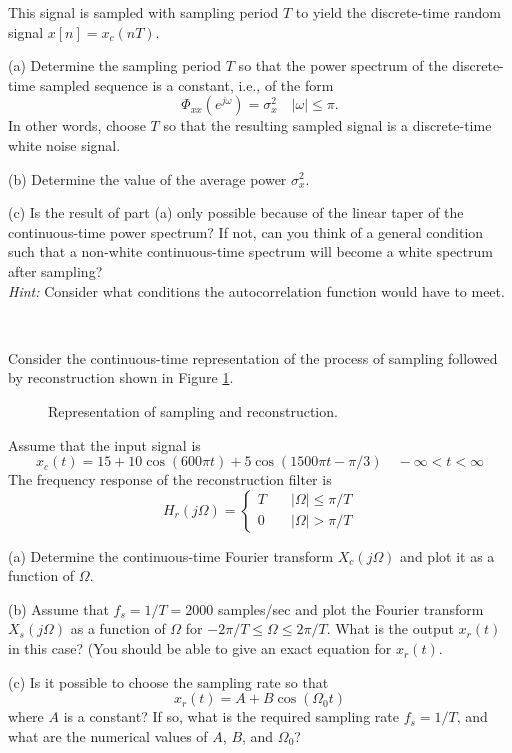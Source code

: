 \documentclass[12pt]{report}
\begin{document}
This signal is sampled with sampling period $T$ to yield the discrete-time
random signal $x[n]=x_c(nT)$.
\begin{description}
\item{(a)} Determine the sampling period $T$ so that the power spectrum of
    the discrete-time sampled sequence is a constant, i.e., of the form\[
    \Phi_{xx}(e^{j\omega}) = \sigma_x^2\quad |\omega|\leq \pi.
    \]
    In other words, choose $T$ so that the resulting sampled signal is a
discrete-time white noise signal.

\item{(b)} Determine the value of the average power $\sigma_x^2$.
\item{(c)}  Is the result of part (a) only possible because of the linear
    taper of the continuous-time power spectrum?  If not, can you think of
    a general condition such that a non-white continuous-time spectrum will
    become a white spectrum after sampling? \\
\emph{Hint:} Consider what conditions the autocorrelation function would have to meet.%
\end{description}
\mbox{}\\

\mbox
{}

Consider the continuous-time representation of the process of sampling
followed by reconstruction shown in Figure \ref{fig:sampreconst}.
\begin{figure}[h]
\centering

\caption{Representation of sampling and reconstruction.\label{fig:sampreconst}}
\end{figure}

Assume that the input signal is
\[
x_c(t)= 15 + 10\cos(600\pi t)+ 5\cos(1500\pi t - \pi/3) \quad
-\infty < t < \infty
\]
The frequency response of the reconstruction filter is
\[
H_r(j\Omega) = \left\{\begin{array}{ll}
    T& \quad |\Omega|\leq \pi/T \\
    0& \quad |\Omega| > \pi/T
    \end{array} \right.
\]

\begin{description}
\item{(a)} Determine the continuous-time Fourier transform
$X_c(j\Omega)$ and plot it as a function of $\Omega$.
    \item{(b)} Assume that $f_s=1/T=2000$ samples/sec and plot the Fourier
        transform $X_s(j\Omega)$  as a function of $\Omega$ for $-2\pi/T
        \leq \Omega \leq 2\pi/T$.  What is the output $x_r(t)$ in this
        case? (You should be able to give an exact equation for $x_r(t)$.
    \item{(c)}
    Is it possible to choose the sampling rate so that
    \[
    x_r(t)=A + B\cos(\Omega_{0} t )
    \]
    where $A$ is a constant?  If so, what is the required sampling rate
    $f_s=1/T$, and what are the numerical values of $A$, $B$, and $\Omega_{0}$?
\end{description}
\mbox{}\\
\end{document}
